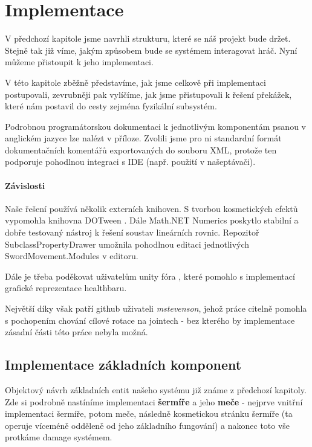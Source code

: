 \chapter{Implementace}

V předchozí kapitole jsme navrhli strukturu, které se náš projekt bude držet. Stejně tak již víme, jakým způsobem bude se systémem interagovat hráč. Nyní můžeme přistoupit k jeho implementaci.

V této kapitole zběžně představíme, jak jsme celkově při implementaci postupovali, zevrubněji pak vylíčíme, jak jsme přistupovali k řešení překážek, které nám postavil do cesty zejména fyzikální subsystém. 

Podrobnou programátorskou dokumentaci k jednotlivým komponentám psanou v anglickém jazyce lze nalézt v příloze. Zvolili jsme pro ni standardní formát dokumentačních komentářů exportovaných do souboru XML, protože ten podporuje pohodlnou integraci s IDE (např. použití v našeptávači).

\subsubsection*{Závislosti}
Naše řešení používá několik externích knihoven. S tvorbou kosmetických efektů vypomohla knihovna DOTween \cite{DoTween}. Dále Math.NET Numerics \cite{MathDotNetNumerics} poskytlo stabilní a dobře testovaný nástroj k řešení soustav lineárních rovnic. Repozitoř SubclassPropertyDrawer \cite{SubclassPropertyDrawer} umožnila pohodlnou editaci jednotlivých SwordMovement.Modules v editoru. 

Dále je třeba poděkovat uživatelům unity fóra \cite{InvertReverseUIMask}, které pomohlo s implementací grafické reprezentace healthbaru.

Největší díky však patří github uživateli \textit{mstevenson}, jehož práce \cite{ConfigurableJointExtensions} citelně pomohla s pochopením chování cílové rotace na jointech - bez kterého by implementace zásadní části této práce nebyla možná.


\section{Implementace základních komponent}

Objektový návrh základních entit našeho systému již známe z předchozí kapitoly. Zde si podrobně nastíníme implementaci \textbf{šermíře} a jeho \textbf{meče} - nejprve vnitřní implementaci šermíře, potom meče, následně kosmetickou stránku šermíře (ta operuje víceméně odděleně od jeho základního fungování) a nakonec toto vše protkáme damage systémem. 

